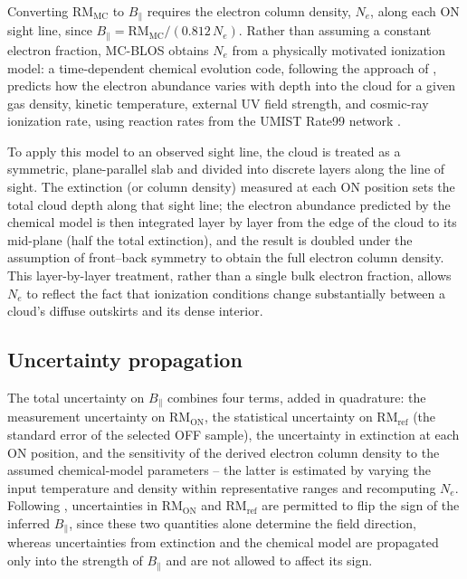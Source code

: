 \documentclass[twocolumn]{aastex631}
\begin{document}
Converting $\mathrm{RM_{MC}}$ to $B_\parallel$ requires the electron column density, $N_e$, along each ON sight line, since $B_\parallel = \mathrm{RM_{MC}} / (0.812\,N_e)$. Rather than assuming a constant electron fraction, MC-BLOS obtains $N_e$ from a physically motivated ionization model: a time-dependent chemical evolution code, following the approach of \citet{gibson2009}, predicts how the electron abundance varies with depth into the cloud for a given gas density, kinetic temperature, external UV field strength, and cosmic-ray ionization rate, using reaction rates from the UMIST Rate99 network \citep{leteuff2000}.

To apply this model to an observed sight line, the cloud is treated as a symmetric, plane-parallel slab and divided into discrete layers along the line of sight. The extinction (or column density) measured at each ON position sets the total cloud depth along that sight line; the electron abundance predicted by the chemical model is then integrated layer by layer from the edge of the cloud to its mid-plane (half the total extinction), and the result is doubled under the assumption of front--back symmetry to obtain the full electron column density. This layer-by-layer treatment, rather than a single bulk electron fraction, allows $N_e$ to reflect the fact that ionization conditions change substantially between a cloud's diffuse outskirts and its dense interior.

\subsection{Uncertainty propagation}
\label{sec:method-uncertainty}

The total uncertainty on $B_\parallel$ combines four terms, added in quadrature: the measurement uncertainty on $\mathrm{RM_{ON}}$, the statistical uncertainty on $\mathrm{RM_{ref}}$ (the standard error of the selected OFF sample), the uncertainty in extinction at each ON position, and the sensitivity of the derived electron column density to the assumed chemical-model parameters -- the latter is estimated by varying the input temperature and density within representative ranges and recomputing $N_e$. Following \citet{tahani2025mcblos}, uncertainties in $\mathrm{RM_{ON}}$ and $\mathrm{RM_{ref}}$ are permitted to flip the sign of the inferred $B_\parallel$, since these two quantities alone determine the field direction, whereas uncertainties from extinction and the chemical model are propagated only into the strength of $B_\parallel$ and are not allowed to affect its sign.
\end{document}
